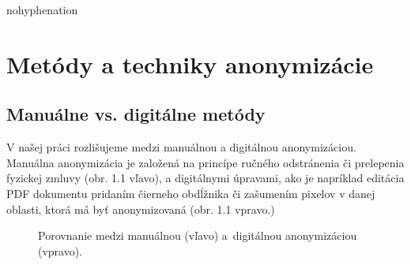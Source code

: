 \begin{hyphenrules}{nohyphenation}
\section{Metódy a techniky anonymizácie}
\subsection{Manuálne vs. digitálne metódy}
V našej práci rozlišujeme medzi manuálnou a digitálnou anonymizáciou. Manuálna anonymizácia je založená na princípe ručného odstránenia či prelepenia fyzickej zmluvy (obr. 1.1 vľavo), a digitálnymi úpravami, ako je napríklad editácia PDF dokumentu pridaním čierneho obdĺžnika či zašumením pixelov v danej oblasti, ktorá má byť anonymizovaná (obr. 1.1 vpravo.)
\begin{figure}[h]
\begin{minipage}[t]{.45\linewidth}
\caption{Porovnanie medzi manuálnou (vľavo) a~digitálnou anonymizáciou (vpravo).}
\end{minipage}\hfill
\begin{minipage}[b]{.45\linewidth}

\end{minipage}
\end{figure}
\end{hyphenrules}
